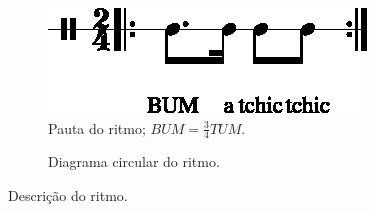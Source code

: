 \begin{figure}[H]
\centering
     \begin{subfigure}[c]{0.45\textwidth}
         \centering
         \includegraphics[width=\textwidth]{chapters/cap-musicalidade-percepcion/treino-ritmo3-1.eps}
         \caption{Pauta do ritmo; $BUM=\frac{3}{4}TUM$.}
         \label{fig:RitmoTUMatchictchic1}
     \end{subfigure}
     \hfill
     \begin{subfigure}[c]{0.45\textwidth}
         \centering
{}
         \caption{Diagrama circular do ritmo.}
         \label{fig:RitmoTUMatchictchic2}
     \end{subfigure}
\caption{Descrição do ritmo.}
\label{fig:abc-percepcionritmica3}
\end{figure}


